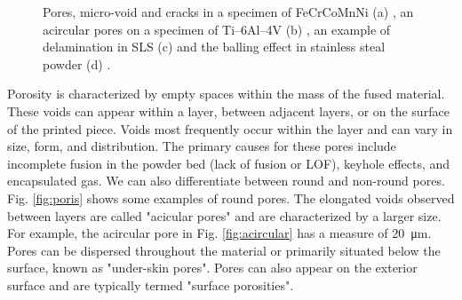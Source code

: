 \begin{figure}
{    }
    \qquad
    \qquad
    \caption[Defect examples in PBF.]{Pores, micro-void and cracks in a specimen of FeCrCoMnNi (a) \cite{mostafaei_defects_2022}, an acircular pores on a specimen of Ti–6Al–4V (b) \cite{tammas-williams_xct_2015}, an example of delamination in SLS (c) \cite{sames_metallurgy_2016} and the balling effect in stainless steal powder (d) \cite{li_balling_2012}.}
\end{figure} 
Porosity is characterized by empty spaces within the mass of the fused material. These voids can appear within a layer, between adjacent layers, or on the surface of the printed piece. Voids most frequently occur within the layer and can vary in size, form, and distribution. The primary causes for these pores include incomplete fusion in the powder bed (lack of fusion or LOF), keyhole effects, and encapsulated gas. We can also differentiate between round and non-round pores. Fig. \ref{fig:poris} shows some examples of round pores. The elongated voids observed between layers are called "acicular pores" and are characterized by a larger size. For example, the acircular pore in Fig. \ref{fig:acircular} has a measure of \SI{20}{\micro\metre}. Pores can be dispersed throughout the material or primarily situated below the surface, known as "under-skin pores". Pores can also appear on the exterior surface and are typically termed "surface porosities".
